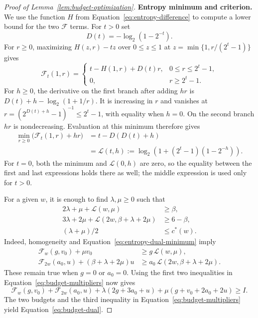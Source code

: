 \begin{proof}[Proof of Lemma~\ref{lem:budget-optimization}]
\medskip\noindent\textbf{Entropy minimum and criterion.}
We use the function \(H\) from Equation~\eqref{eq:entropy-difference}
to compute a lower bound for the two \(\mathcal F\) terms.
For \(t>0\) set
\[
 D(t)=-\log_2(1-2^{-t}).
\]
For \(r\ge0\), maximizing \(H(z,r)-tz\) over \(0\le z\le1\)
at \(z=\min\{1,r/(2^t-1)\}\) gives
\[
 \mathcal F_t(1,r)=
 \begin{cases}
 t-H(1,r)+D(t)r,&0\le r\le2^t-1,\\
 0,&r\ge2^t-1.
 \end{cases}
\]
For \(h\ge0\), the derivative on the first branch after adding \(hr\)
is \(D(t)+h-\log_2(1+1/r)\). It is increasing in \(r\) and vanishes
at \(r=(2^{D(t)+h}-1)^{-1}\le2^t-1\), with equality when \(h=0\).
On the second branch \(hr\) is nondecreasing. Evaluation at this
minimum therefore gives
\begin{equation}\label{eq:entropy-dual-minimum}
 \begin{aligned}
 \min_{r\ge0}\bigl(\mathcal F_t(1,r)+hr\bigr)
 &=t-D(D(t)+h)\\
 &=\mathcal L(t,h):=
   \log_2\!\left(1+(2^t-1)(1-2^{-h})\right).
 \end{aligned}
\end{equation}
For \(t=0\), both the minimum and \(\mathcal L(0,h)\) are zero,
so the equality between the first and last expressions holds there
as well; the middle expression is used only for \(t>0\).

For a given \(w\), it is enough to find \(\lambda,\mu\ge0\) such
that
\begin{equation}\label{eq:budget-multipliers}
 \begin{aligned}
 2\lambda+\mu+\mathcal L(w,\mu)&\ge\beta,\\
 3\lambda+2\mu+
   \mathcal L(2w,\beta+\lambda+2\mu)&\ge6-\beta,\\
 (\lambda+\mu)/2&\le c^*(w).
 \end{aligned}
\end{equation}
Indeed, homogeneity and Equation~\eqref{eq:entropy-dual-minimum}
imply
\[
 \begin{aligned}
 \mathcal F_w(g,v_0)+\mu v_0&\ge g\,\mathcal L(w,\mu),\\
 \mathcal F_{2w}(a_0,u)+(\beta+\lambda+2\mu)u
   &\ge a_0\,\mathcal L(2w,\beta+\lambda+2\mu).
 \end{aligned}
\]
These remain true when \(g=0\) or \(a_0=0\). Using the first two
inequalities in Equation~\eqref{eq:budget-multipliers} now gives
\[
 \mathcal F_w(g,v_0)+\mathcal F_{2w}(a_0,u)
 +\lambda(2g+3a_0+u)+\mu(g+v_0+2a_0+2u)\ge I.
\]
The two budgets and the third inequality in
Equation~\eqref{eq:budget-multipliers} yield
Equation~\eqref{eq:budget-dual}.


\end{proof}
